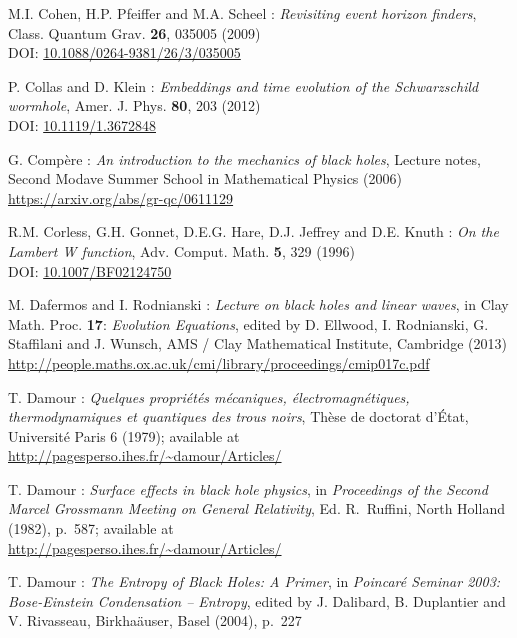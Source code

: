 \begin{thebibliography}{123}
M.I. Cohen, H.P. Pfeiffer and M.A. Scheel :
{\em Revisiting event horizon finders},
Class. Quantum Grav. {\bf 26}, 035005 (2009)\\
DOI: \href{http://dx.doi.org/10.1088/0264-9381/26/3/035005}{10.1088/0264-9381/26/3/035005}

P. Collas and D. Klein :
{\em Embeddings and time evolution of the Schwarzschild wormhole},
Amer. J. Phys. {\bf 80}, 203 (2012)\\
DOI: \href{http://dx.doi.org/10.1119/1.3672848}{10.1119/1.3672848}

G. Compère :
{\em An introduction to the mechanics of black holes},
Lecture notes, Second Modave Summer School in Mathematical Physics (2006)\\
\url{https://arxiv.org/abs/gr-qc/0611129}

R.M. Corless, G.H. Gonnet, D.E.G. Hare, D.J. Jeffrey and D.E. Knuth :
{\em On the Lambert W function},
Adv. Comput. Math. {\bf 5}, 329 (1996)\\
DOI: \href{http://dx.doi.org/10.1007/BF02124750}{10.1007/BF02124750}

M. Dafermos and I. Rodnianski : {\em Lecture on black holes and linear waves},
in  Clay Math. Proc. {\bf 17}: {\em Evolution Equations}, edited by
D. Ellwood, I. Rodnianski, G. Staffilani and J. Wunsch, AMS / Clay Mathematical Institute,
Cambridge (2013) \\
\url{http://people.maths.ox.ac.uk/cmi/library/proceedings/cmip017c.pdf}

T. Damour : {\em Quelques propri\'et\'es m\'ecaniques, \'electromagn\'etiques,
thermo\-dy\-na\-mi\-ques et quantiques des trous noirs},
Th\`ese de doctorat d'\'Etat, Universit\'e Paris 6 (1979); available at\\
\url{http://pagesperso.ihes.fr/~damour/Articles/}

T. Damour : {\em Surface effects in black hole physics},
in {\em Proceedings of the Second Marcel Grossmann Meeting on General
Relativity}, Ed. R.~Ruffini, North Holland (1982), p.~587; available at\\
\url{http://pagesperso.ihes.fr/~damour/Articles/}

T. Damour : {\em The Entropy of Black Holes: A Primer},
in {\em Poincaré Seminar 2003: Bose-Einstein Condensation -- Entropy},
edited by J. Dalibard, B. Duplantier and V. Rivasseau, Birkha\"auser, Basel (2004),
p.~227


\end{thebibliography}
